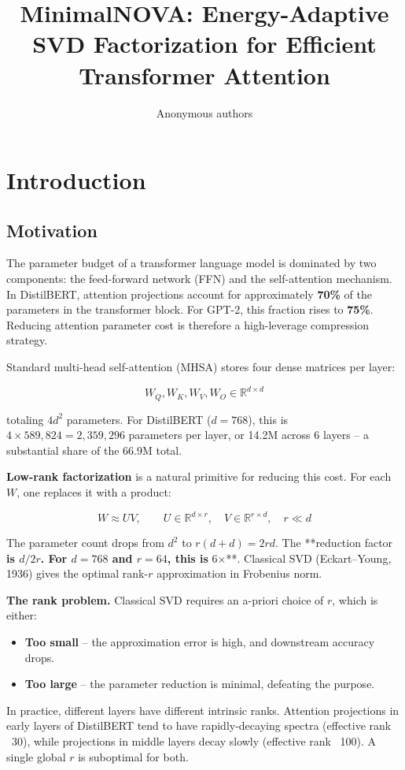 \title{\textbf{MinimalNOVA: Energy-Adaptive SVD Factorization for Efficient Transformer Attention}}

\author{Anonymous authors}



\section{Introduction}

\subsection{Motivation}

The parameter budget of a transformer language model is dominated by two 
components: the feed-forward network (FFN) and the self-attention mechanism. 
In DistilBERT, attention projections account for approximately \textbf{70\%} of the 
parameters in the transformer block. For GPT-2, this fraction rises to 
\textbf{75\%}. Reducing attention parameter cost is therefore a high-leverage 
compression strategy.

Standard multi-head self-attention (MHSA) stores four dense matrices per 
layer:

\[
W_Q, W_K, W_V, W_O \in \mathbb{R}^{d \times d}
\tag{1.1}
\]

totaling $4d^2$ parameters. For DistilBERT ($d = 768$), this is $4 \times 589{,}824 = 2{,}359{,}296$ 
parameters per layer, or 14.2M across 6 layers -- a substantial share of the 
66.9M total.

\textbf{Low-rank factorization} is a natural primitive for reducing this cost. 
For each $W$, one replaces it with a product:

\[
W \approx U V, \qquad
U \in \mathbb{R}^{d \times r}, \quad V \in \mathbb{R}^{r \times d}, \quad r \ll d
\tag{1.2}
\]

The parameter count drops from $d^2$ to $r(d + d) = 2rd$. The **reduction 
factor\textbf{ is $d / 2r$. For $d = 768$ and $r = 64$, this is }6$\times$**. Classical 
SVD (Eckart--Young, 1936) gives the optimal rank-$r$ approximation in 
Frobenius norm.

\textbf{The rank problem.} Classical SVD requires an a-priori choice of $r$, which 
is either:

\begin{itemize}
\item \textbf{Too small} -- the approximation error is high, and downstream accuracy
  drops.
\item \textbf{Too large} -- the parameter reduction is minimal, defeating the purpose.

\end{itemize}
In practice, different layers have different intrinsic ranks. Attention 
projections in early layers of DistilBERT tend to have rapidly-decaying 
spectra (effective rank ~30), while projections in middle layers decay 
slowly (effective rank ~100). A single global $r$ is suboptimal for both.

